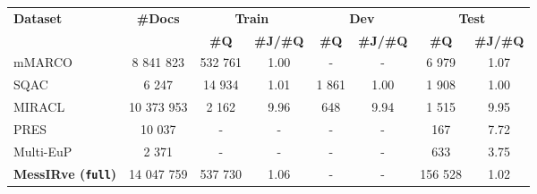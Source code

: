 \begin{tabular}{ l c cc cc cc }
    \toprule
    \multirow{2.5}{*}{\textbf{Dataset}} & \multirow{2.5}{*}{\textbf{\#Docs}} & \multicolumn{2}{c}{\textbf{Train}} & \multicolumn{2}{c}{\textbf{Dev}} & \multicolumn{2}{c}{\textbf{Test}}                                                           \\
    \cmidrule(lr){3-4} \cmidrule(lr){5-6} \cmidrule(lr){7-8}
                                        &                                     & \textbf{\#Q}                      & \textbf{\#J/\#Q} & \textbf{\#Q} & \textbf{\#J/\#Q} & \textbf{\#Q} & \textbf{\#J/\#Q} \\
    \midrule\midrule
    \thead[l]{mMARCO     \\ \citep{bonifacio2021mmarco}}      & 8 841 823   & 532 761     & 1.00      & -        & -      & 6 979    & 1.07       \\
    \thead[l]{SQAC       \\ \citep{gutierrez2022maria}}       & 6 247       & 14 934      & 1.01      & 1 861    & 1.00   & 1 908    & 1.00       \\
    \thead[l]{MIRACL     \\ \citep{zhang2023miracl}}          & 10 373 953  & 2 162       & 9.96      & 648      & 9.94   & 1 515    & 9.95       \\
    \thead[l]{PRES       \\ \citep{kamateri2019test}}         & 10 037      & -           & -         & -        & -      & 167      & 7.72       \\
    \thead[l]{Multi-EuP  \\ \citep{yang-etal-2023-multi-eup}} & 2 371       & -           & -         & -        & -      & 633      & 3.75       \\
    \midrule
    \textbf{MessIRve (\texttt{full})}                                      & 14 047 759  & 537 730     & 1.06         & -        & -      & 156 528  & 1.02    \\
    \bottomrule
\end{tabular}

